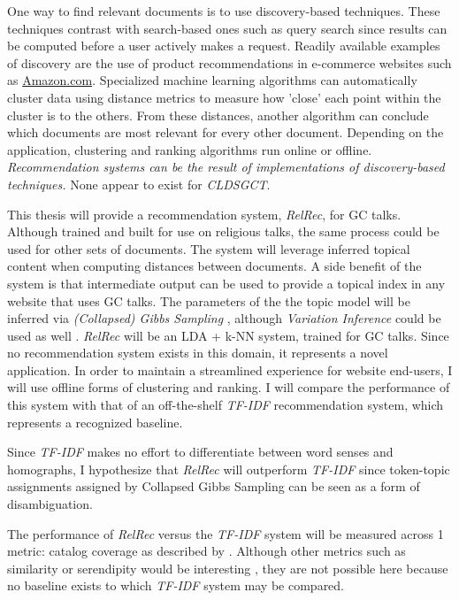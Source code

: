 One way to find relevant documents is to use discovery-based techniques. These techniques contrast with search-based ones such as query search since results can be computed before a user actively makes a request. Readily available examples of discovery are the use of product recommendations in e-commerce websites such as \url{Amazon.com}. Specialized machine learning algorithms can automatically cluster data using distance metrics to measure how 'close' each point within the cluster is to the others. From these distances, another algorithm can conclude which documents are most relevant for every other document. Depending on the application, clustering and ranking algorithms run online or offline. \textit{Recommendation systems can be the result of implementations of discovery-based techniques.} None appear to exist for \emph{CLDSGCT}.

This thesis will provide a recommendation system, \emph{RelRec}, for GC talks. Although trained and built for use on religious talks, the same process could be used for other sets of documents. The system will leverage inferred topical content when computing distances between documents. A side benefit of the system is that intermediate output can be used to provide a topical index in any website that uses GC talks. The parameters of the the topic model will be inferred via \emph{(Collapsed) Gibbs Sampling} \citep{Porteous:2008:FCG:1401890.1401960}, although \emph{Variation Inference} could be used as well \citep{blei2006variational}. \emph{RelRec} will be an LDA + k-NN system, trained for GC talks. Since no recommendation system exists in this domain, it represents a novel application. In order to maintain a streamlined experience for website end-users, I will use offline forms of clustering and ranking. I will compare the performance of this system with that of an off-the-shelf \emph{TF-IDF} recommendation system, which represents a recognized baseline.

Since \emph{TF-IDF} makes no effort to differentiate between word senses and homographs, I hypothesize that \emph{RelRec} will outperform \emph{TF-IDF} since token-topic assignments assigned by Collapsed Gibbs Sampling can be seen as a form of disambiguation.

The performance of \emph{RelRec} versus the \emph{TF-IDF} system will be measured across 1 metric: catalog coverage as described by \cite{Ge:2010:BAE:1864708.1864761}. Although other metrics such as similarity or serendipity would be interesting \citep{Ge:2010:BAE:1864708.1864761}, they are not possible here because no baseline exists to which \emph{TF-IDF} system may be compared. %


